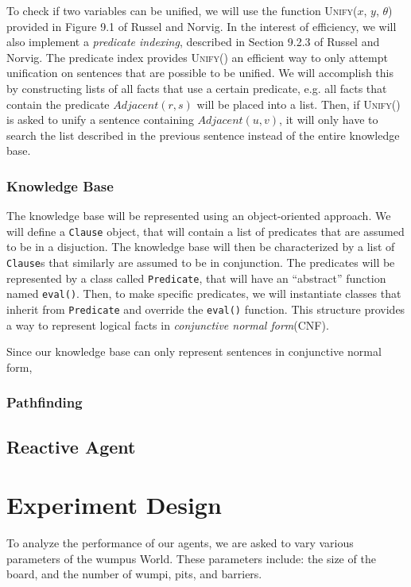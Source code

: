 \documentclass{article}
\begin{document}
				To check if two variables can be unified, we will use the function \textsc{Unify}($x$, $y$, $\theta$) provided in Figure 9.1 of Russel and Norvig.
				In the interest of efficiency, we will also implement a \textit{predicate indexing}, described in Section 9.2.3 of Russel and Norvig\cite{ai}.
				The predicate index provides \textsc{Unify}() an efficient way to only attempt unification on sentences that are possible to be unified. 
				We will accomplish this by constructing lists of all facts that use a certain predicate, e.g. all facts that contain the predicate $Adjacent(r,s)$ will be placed into a list.
				Then, if \textsc{Unify()} is asked to unify a sentence containing $Adjacent(u,v)$, it will only have to search the list described in the previous sentence instead of the entire knowledge base.
				
			\subsubsection{Knowledge Base}
			
				The knowledge base will be represented using an object-oriented approach.
				We will define a \texttt{Clause} object, that will contain a list of predicates that are assumed to be in a disjuction. The knowledge base will then be characterized by a list of \texttt{Clause}s that similarly are assumed to be in conjunction. 
				The predicates will be represented by a class called \texttt{Predicate}, that will have an ``abstract'' function named \texttt{eval()}. Then, to make specific predicates, we will instantiate classes that inherit from \texttt{Predicate} and override the \texttt{eval()} function. This structure provides a way to represent logical facts in \textit{conjunctive normal form}(CNF).
				
				Since our knowledge base can only represent sentences in conjunctive normal form, 
			
			
			\subsubsection{Pathfinding}
			
		\subsection{Reactive Agent}
			
		
		
	\section{Experiment Design}
	
	To analyze the performance of our agents, we are asked to vary various parameters of the wumpus World. These parameters include: the size of the board, and the number of wumpi, pits, and barriers. 
	
	
	

	




		
	
\end{document}
